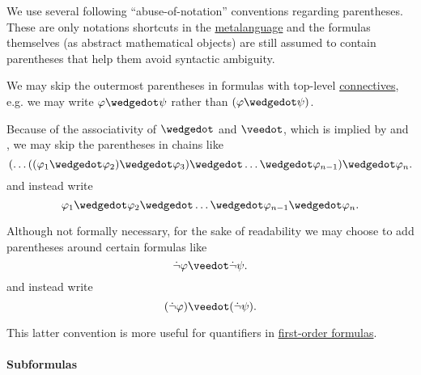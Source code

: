 \begin{remark}\label{rem:propositional_formula_parentheses}
  We use several following \enquote{abuse-of-notation} conventions regarding parentheses. These are only notations shortcuts in the \hyperref[con:metalogic]{metalanguage} and the formulas themselves (as abstract mathematical objects) are still assumed to contain parentheses that help them avoid syntactic ambiguity.

  \begin{thmenum}
     We may skip the outermost parentheses in formulas with top-level \hyperref[def:propositional_alphabet/connectives]{connectives}, e.g. we may write \( \varphi \synwedge \psi \) rather than \( (\varphi \synwedge \psi) \).

     Because of the associativity of \( \synwedge \) and \( \synvee \), which is implied by  and , we may skip the parentheses in chains like
    \begin{equation*}
      ( \ldots ((\varphi_1 \synwedge \varphi_2) \synwedge \varphi_3) \synwedge \ldots \synwedge \varphi_{n-1} ) \synwedge \varphi_n.
    \end{equation*}
    and instead write
    \begin{equation*}
      \varphi_1 \synwedge \varphi_2 \synwedge \ldots \synwedge \varphi_{n-1} \synwedge \varphi_n.
    \end{equation*}

     Although not formally necessary, for the sake of readability we may choose to add parentheses around certain formulas like
    \begin{equation*}
      \synneg \varphi \synvee \synneg \psi.
    \end{equation*}
    and instead write
    \begin{equation*}
      (\synneg \varphi) \synvee (\synneg \psi).
    \end{equation*}

    This latter convention is more useful for quantifiers in \hyperref[def:first_order_syntax/formula]{first-order formulas}.
  \end{thmenum}
\end{remark}

\paragraph{Subformulas}

